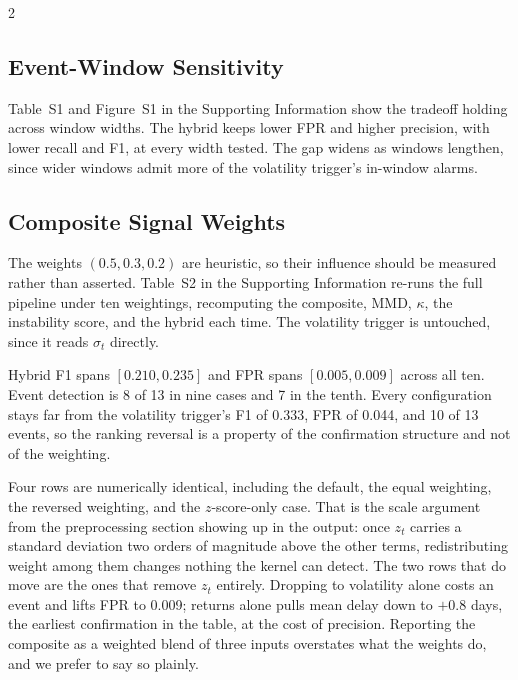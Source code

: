 \documentclass{book}
\begin{document}
\begin{multicols}{2}
\subsection{Event-Window Sensitivity}
Table~S1 and Figure~S1 in the Supporting Information show the tradeoff holding across window widths. The hybrid keeps lower FPR and higher precision, with lower recall and F1, at every width tested. The gap widens as windows lengthen, since wider windows admit more of the volatility trigger's in-window alarms.





\subsection{Composite Signal Weights}
\label{sec:weights}
The weights $(0.5,0.3,0.2)$ are heuristic, so their influence should be measured rather than asserted. Table~S2 in the Supporting Information re-runs the full pipeline under ten weightings, recomputing the composite, MMD, $\kappa$, the instability score, and the hybrid each time. The volatility trigger is untouched, since it reads $\sigma_t$ directly.

Hybrid F1 spans $[0.210,0.235]$ and FPR spans $[0.005,0.009]$ across all ten. Event detection is 8 of 13 in nine cases and 7 in the tenth. Every configuration stays far from the volatility trigger's F1 of 0.333, FPR of 0.044, and 10 of 13 events, so the ranking reversal is a property of the confirmation structure and not of the weighting.

Four rows are numerically identical, including the default, the equal weighting, the reversed weighting, and the $z$-score-only case. That is the scale argument from the preprocessing section showing up in the output: once $z_t$ carries a standard deviation two orders of magnitude above the other terms, redistributing weight among them changes nothing the kernel can detect. The two rows that do move are the ones that remove $z_t$ entirely. Dropping to volatility alone costs an event and lifts FPR to 0.009; returns alone pulls mean delay down to $+0.8$ days, the earliest confirmation in the table, at the cost of precision. Reporting the composite as a weighted blend of three inputs overstates what the weights do, and we prefer to say so plainly.


\end{multicols}
\end{document}
